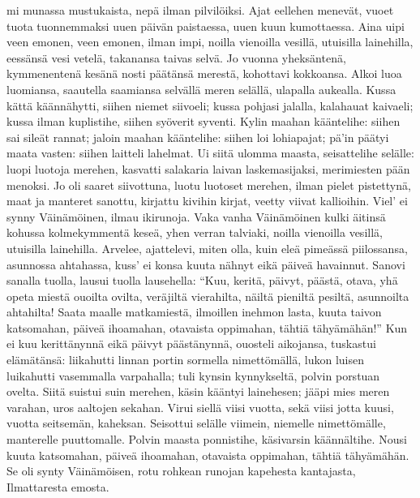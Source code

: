     mi munassa mustukaista,
    nepä ilman pilvilöiksi.
  \endverse
  \beginverse
    Ajat eellehen menevät,
    vuoet tuota tuonnemmaksi
    uuen päivän paistaessa,
    uuen kuun kumottaessa.
    Aina uipi veen emonen,
    veen emonen, ilman impi,
  \endverse
  \beginverse
    noilla vienoilla vesillä,
    utuisilla lainehilla,
    eessänsä vesi vetelä,
    takanansa taivas selvä.
    Jo vuonna yheksäntenä,
    kymmenentenä kesänä
    nosti päätänsä merestä,
    kohottavi kokkoansa.
    Alkoi luoa luomiansa,
    saautella saamiansa
  \endverse
  \beginverse
    selvällä meren selällä,
    ulapalla aukealla.
    Kussa kättä käännähytti,
    siihen niemet siivoeli;
    kussa pohjasi jalalla,
    kalahauat kaivaeli;
    kussa ilman kuplistihe,
    siihen syöverit syventi.
  \endverse
  \beginverse
    Kylin maahan kääntelihe:
    siihen sai sileät rannat;
  \endverse
  \beginverse
    jaloin maahan kääntelihe:
    siihen loi lohiapajat;
    pä'in päätyi maata vasten:
    siihen laitteli lahelmat.
    Ui siitä ulomma maasta,
    seisattelihe selälle:
    luopi luotoja merehen,
    kasvatti salakaria
    laivan laskemasijaksi,
    merimiesten pään menoksi.
  \endverse
  \beginverse
    Jo oli saaret siivottuna,
    luotu luotoset merehen,
    ilman pielet pistettynä,
    maat ja manteret sanottu,
    kirjattu kivihin kirjat,
    veetty viivat kallioihin.
    Viel' ei synny Väinämöinen,
    ilmau ikirunoja.
    Vaka vanha Väinämöinen
    kulki äitinsä kohussa
  \endverse
  \beginverse
    kolmekymmentä keseä,
    yhen verran talviaki,
    noilla vienoilla vesillä,
    utuisilla lainehilla.
    Arvelee, ajattelevi,
    miten olla, kuin eleä
    pimeässä piilossansa,
    asunnossa ahtahassa,
    kuss' ei konsa kuuta nähnyt
    eikä päiveä havainnut.
  \endverse
  \beginverse
    Sanovi sanalla tuolla,
    lausui tuolla lausehella:
    ``Kuu, keritä, päivyt, päästä,
    otava, yhä opeta
    miestä ouoilta ovilta,
    veräjiltä vierahilta,
    näiltä pieniltä pesiltä,
    asunnoilta ahtahilta!
    Saata maalle matkamiestä,
    ilmoillen inehmon lasta,
    kuuta taivon katsomahan,
    päiveä ihoamahan,
    otavaista oppimahan,
    tähtiä tähyämähän!''
    Kun ei kuu kerittänynnä
    eikä päivyt päästänynnä,
    ouosteli aikojansa,
    tuskastui elämätänsä:
    liikahutti linnan portin
    sormella nimettömällä,
  \endverse
  \beginverse
    lukon luisen luikahutti
    vasemmalla varpahalla;
    tuli kynsin kynnykseltä,
    polvin porstuan ovelta.
    Siitä suistui suin merehen,
    käsin kääntyi lainehesen;
    jääpi mies meren varahan,
    uros aaltojen sekahan.
  \endverse
  \beginverse
    Virui siellä viisi vuotta,
    sekä viisi jotta kuusi,
  \endverse
  \beginverse
    vuotta seitsemän, kaheksan.
    Seisottui selälle viimein,
    niemelle nimettömälle,
    manterelle puuttomalle.
    Polvin maasta ponnistihe,
    käsivarsin käännältihe.
    Nousi kuuta katsomahan,
    päiveä ihoamahan,
    otavaista oppimahan,
    tähtiä tähyämähän.
  \endverse
  \beginverse
    Se oli synty Väinämöisen,
    rotu rohkean runojan
    kapehesta kantajasta,
    Ilmattaresta emosta.
  \endverse
\endsong


